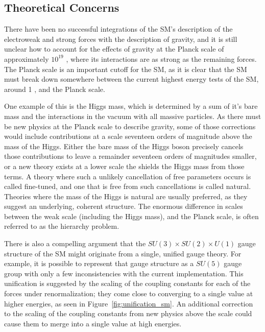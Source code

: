 \subsection{Theoretical Concerns}

There have been no successful integrations of the \ac{SM}'s description of the electroweak and strong forces with the description of gravity, and it is still unclear how to account for the effects of gravity at the Planck scale of approximately $10^{19}$ \GeV, where its interactions are as strong as the remaining forces.
The Planck scale is an important cutoff for the \ac{SM}, as it is clear that the \ac{SM} must break down somewhere between the current highest energy tests of the \ac{SM}, around 1 \TeV, and the Planck scale.

One example of this is the Higgs mass, which is determined by a sum of it's bare mass and the interactions in the vacuum with all massive particles.
As there must be new physics at the Planck scale to describe gravity, some of those corrections would include contributions at a scale seventeen orders of magnitude above the mass of the Higgs.
Either the bare mass of the Higgs boson precisely cancels those contributions to leave a remainder seventeen orders of magnitudes smaller, or a new theory exists at a lower scale the shields the Higgs mass from those terms.
A theory where such a unlikely cancellation of free parameters occurs is called fine-tuned, and one that is free from such cancellations is called natural.
Theories where the mass of the Higgs is natural are usually preferred, as they suggest an underlying, coherent structure.
The enormous difference in scales between the weak scale (including the Higgs mass), and the Planck scale, is often referred to as the hierarchy problem.

There is also a compelling argument that the $SU(3)\times SU(2) \times U(1)$ gauge structure of the \ac{SM} might originate from a single, unified gauge theory.
For example, it is possible to represent that gauge structure as a $SU(5)$ gauge group with only a few inconsistencies with the current implementation.
This unification is suggested by the scaling of the coupling constants for each of the forces under renormalization; they come close to converging to a single value at higher energies, as seen in Figure~\ref{fig:unification_sm}. 
An additional correction to the scaling of the coupling constants from new physics above the \TeV scale could cause them to merge into a single value at high energies. 

